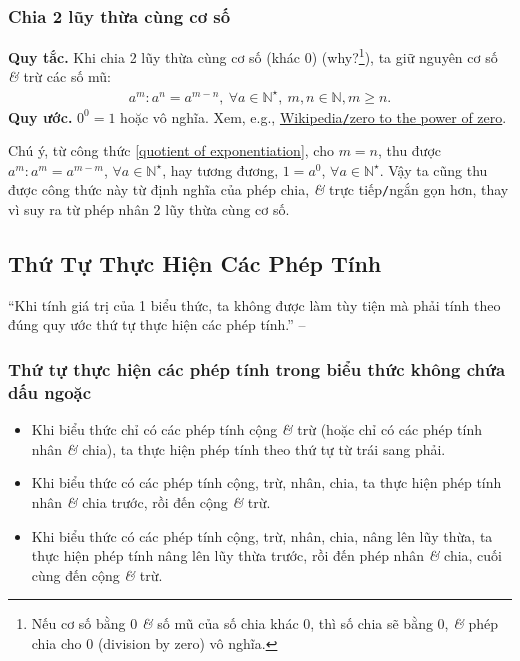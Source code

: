 \documentclass{article}
\numberwithin{equation}{section}
\begin{document}
\subsubsection{Chia 2 lũy thừa cùng cơ số}
\textbf{Quy tắc.} Khi chia 2 lũy thừa cùng cơ số (khác $0$) (why?\footnote{Nếu cơ số bằng 0 \textit{\&} số mũ của số chia khác 0, thì số chia sẽ bằng 0, \textit{\&} phép chia cho 0 (division by zero) vô nghĩa.}), ta giữ nguyên cơ số \textit{\&} trừ các số mũ:
\begin{align}
	\label{quotient of exponentiation}
	\boxed{a^m:a^n = a^{m-n},\ \forall a\in\mathbb{N}^\star,\ m,n\in\mathbb{N},m\ge n.}
\end{align}
\textbf{Quy ước.} $0^0 = 1$ hoặc vô nghĩa. Xem, e.g., \href{https://en.wikipedia.org/wiki/Zero_to_the_power_of_zero}{Wikipedia\texttt{/}zero to the power of zero}.

Chú ý, từ công thức \eqref{quotient of exponentiation}, cho $m = n$, thu được $a^m:a^m = a^{m - m}$, $\forall a\in\mathbb{N}^\star$, hay tương đương, $1 = a^0$, $\forall a\in\mathbb{N}^\star$. Vậy ta cũng thu được công thức này từ định nghĩa của phép chia, \textit{\&} trực tiếp\texttt{/}ngắn gọn hơn, thay vì suy ra từ phép nhân 2 lũy thừa cùng cơ số.


\subsection{Thứ Tự Thực Hiện Các Phép Tính}
``Khi tính giá trị của 1 biểu thức, ta không được làm tùy tiện mà phải tính theo đúng quy ước thứ tự thực hiện các phép tính.'' -- \cite[p. 26]{SGK_Toan_6_Canh_Dieu_tap_2}

\subsubsection{Thứ tự thực hiện các phép tính trong biểu thức không chứa dấu ngoặc}
\begin{tcolorbox}
	\begin{itemize}
		\item Khi biểu thức chỉ có các phép tính cộng \textit{\&} trừ (hoặc chỉ có các phép tính nhân \textit{\&} chia), ta thực hiện phép tính theo thứ tự từ trái sang phải.
		\item Khi biểu thức có các phép tính cộng, trừ, nhân, chia, ta thực hiện phép tính nhân \textit{\&} chia trước, rồi đến cộng \textit{\&} trừ.
		\item Khi biểu thức có các phép tính cộng, trừ, nhân, chia, nâng lên lũy thừa, ta thực hiện phép tính nâng lên lũy thừa trước, rồi đến phép nhân \textit{\&} chia, cuối cùng đến cộng \textit{\&} trừ.
	\end{itemize}
\end{tcolorbox}
\end{document}
